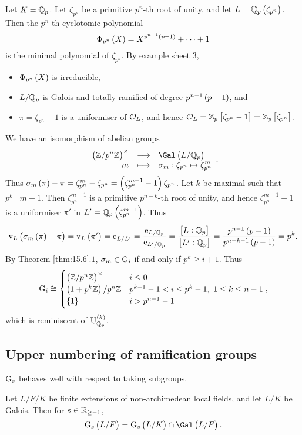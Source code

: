 \begin{example*}
Let $ K = \mathbb{Q}_p $. Let $ \zeta_{p^n} $ be a primitive $ p^n $-th root of unity, and let $ L = \QQ_p\br{\zeta_{p^n}} $. Then the $ p^n $-th cyclotomic polynomial
$$ \Phi_{p^n}\br{X} = X^{p^{n - 1}\br{p - 1}} + \dots + 1 $$
is the minimal polynomial of $ \zeta_{p^n} $. By example sheet $ 3 $,
\begin{itemize}
\item $ \Phi_{p^n}\br{X} $ is irreducible,
\item $ L / \mathbb{Q}_p $ is Galois and totally ramified of degree $ p^{n - 1}\br{p - 1} $, and
\item $ \pi = \zeta_{p^n} - 1 $ is a uniformiser of $ \mathcal{O}_L $, and hence $ \OOO_L = \ZZ_p\sbr{\zeta_{p^n} - 1} = \ZZ_p\sbr{\zeta_{p^n}} $.
\end{itemize}
We have an isomorphism of abelian groups
$$ \function{\br{\ZZ / p^n\ZZ}^\times}{\Gal\br{L / \QQ_p}}{m}{\sigma_m : \zeta_{p^n} \mapsto \zeta_{p^n}^m}. $$
Thus $ \sigma_m\br{\pi} - \pi = \zeta_{p^n}^m - \zeta_{p^n} = \br{\zeta_{p^n}^{m - 1} - 1}\zeta_{p^n} $. Let $ k $ be maximal such that $ p^k \mid m - 1 $. Then $ \zeta_{p^n}^{m - 1} $ is a primitive $ p^{n - k} $-th root of unity, and hence $ \zeta_{p^n}^{m - 1} - 1 $ is a uniformiser $ \pi' $ in $ L' = \QQ_p\br{\zeta_{p^n}^{m - 1}} $. Thus
$$ \v_L\br{\sigma_m\br{\pi} - \pi} = \v_L\br{\pi'} = \e_{L / L'} = \dfrac{\e_{L / \QQ_p}}{\e_{L' / \QQ_p}} = \dfrac{\sbr{L : \QQ_p}}{\sbr{L' : \QQ_p}} = \dfrac{p^{n - 1}\br{p - 1}}{p^{n - k - 1}\br{p - 1}} = p^k. $$
By Theorem \ref{thm:15.6}.$ 1 $, $ \sigma_m \in \mathrm{G}_i $ if and only if $ p^k \ge i + 1 $. Thus
$$ \G_i \cong
\begin{cases}
\br{\ZZ / p^n\ZZ}^\times & i \le 0 \\
\br{1 + p^k\ZZ} / p^n\ZZ & p^{k - 1} - 1 < i \le p^k - 1, \ 1 \le k \le n - 1 \\
\cbr{1} & i > p^{n - 1} - 1
\end{cases},
$$
which is reminiscent of $ \U_{\QQ_p}^{\br{k}} $.
\end{example*}

\subsection{Upper numbering of ramification groups}

$ \mathrm{G}_s $ behaves well with respect to taking subgroups.

\begin{proposition}
\label{prop:16.3}
Let $ L / F / K $ be finite extensions of non-archimedean local fields, and let $ L / K $ be Galois. Then for $ s \in \mathbb{R}_{\ge -1} $,
$$ \G_s\br{L / F} = \G_s\br{L / K} \cap \Gal\br{L / F}. $$
\end{proposition}


